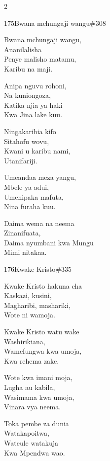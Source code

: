 \begin{multicols}{2}
\begin{hymn}{175}{Bwana mchungaji wangu}{\#308}
\begin{stanza}
Bwana mchungaji wangu,\\
Ananilalisha\\
Penye malisho matamu,\\
Karibu na maji.
\end{stanza}
\begin{stanza}
Anipa nguvu rohoni,\\
Na kuniongoza,\\
Katika njia ya haki\\
Kwa Jina lake kuu.
\end{stanza}
\begin{stanza}
Ningakaribia kifo\\
Sitahofu wovu,\\
Kwani u karibu nami,\\
Utanifariji.
\end{stanza}
\begin{stanza}
Umeandaa meza yangu,\\
Mbele ya adui,\\
Umenipaka mafuta,\\
Nina furaha kuu.
\end{stanza}
\begin{stanza}
Daima wema na neema\\
Zinanifuata,\\
Daima nyumbani kwa Mungu\\
Mimi nitakaa.
\end{stanza}
\end{hymn}

\begin{hymn}{176}{Kwake Kristo}{\#335}
\begin{stanza}
Kwake Kristo hakuna cha\\
Kaskazi, kusini,\\
Magharibi, mashariki,\\
Wote ni wamoja.
\end{stanza}
\begin{stanza}
Kwake Kristo watu wake\\
Washirikiana,\\
Wamefungwa kwa umoja,\\
Kwa rehema zake.
\end{stanza}
\begin{stanza}
Wote kwa imani moja,\\
Lugha au kabila,\\
Wasimama kwa umoja,\\
Vinara vya neema.
\end{stanza}
\begin{stanza}
Toka pembe za dunia\\
Watakapoitwa,\\
Wateule watakuja\\
Kwa Mpendwa wao.
\end{stanza}
\end{hymn}


\end{multicols}
